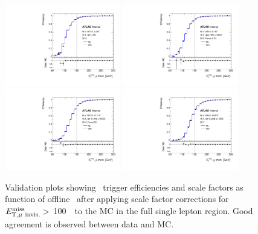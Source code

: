 \begin{figure}[tb!]
	\centering
	\includegraphics[width=0.45\textwidth]{chapters/c6/figures/METTriggerCalibration/validation_HLT_xe70_mht.pdf}
	\includegraphics[width=0.45\textwidth]{chapters/c6/figures/METTriggerCalibration/validation_HLT_xe90_mht_L1XE50.pdf}
	\includegraphics[width=0.45\textwidth]{chapters/c6/figures/METTriggerCalibration/validation_HLT_xe110_mht_L1XE50.pdf}
	\includegraphics[width=0.45\textwidth]{chapters/c6/figures/METTriggerCalibration/validation_HLT_xe110_pufit_L1XE55.pdf}
	\caption{Validation plots showing \MET~trigger efficiencies and scale factors as function of offline \METnomu~after applying scale factor corrections for $E_{\mathrm{T, \mu~invis.}}^{\mathrm{miss}} >$ 100~\GeV~to the MC in the full single lepton region. Good agreement is observed between data and MC.}
	\label{fig:TrigSF_validation}
\end{figure}

